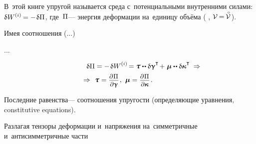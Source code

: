 \begin{otherlanguage}{russian}

В~этой книге упругой называется среда с~потенциальными внутренними силами:
${\variation{\internalwork} = - \hspace{.16ex} \variation{\potentialenergydensity}}$,
где~$\Pi$\:--- энергия деформации на~единицу объёма
( , ${\mathcal{V} \hspace{-0.2ex} = \hspace{-0.2ex} \mathcircabove{\mathcal{V}}\hspace{.12ex}}$).

Имея соотношения (...)

...

\begin{multline}\label{micropolar.constitutiveequations}
\hspace*{4em}
\variation{\potentialenergydensity} = - \hspace{.25ex} \variation{\internalwork} \hspace{-0.15ex}
= \forcestresstensor \dotdotp \variation{\distortiontensor}^{\T} \hspace{-0.25ex}
+ \hspace{.1ex} \couplestresstensor \dotdotp \variation{\wrynesstensor}^{\T}
\hspace{.6ex} \Rightarrow
\\[-0.1em]
%
\Rightarrow \hspace{.88ex}
\forcestresstensor = \scalebox{0.92}[0.92]{$ \displaystyle \frac{\raisemath{-0.125em}{\partial\hspace{.1ex} \potentialenergydensity^{\mathstrut}}}{\partial \distortiontensor}$}
\hspace{.15ex} ,
\hspace{.8ex}
\couplestresstensor = \scalebox{0.92}[0.92]{$ \displaystyle \frac{\raisemath{-0.125em}{\partial\hspace{.1ex} \potentialenergydensity^{\mathstrut}}}{\partial \wrynesstensor}$}
\hspace{.2ex} .
\hspace*{3.33em}
\end{multline}

Последние равенства\:--- соотношения упругости (определяющие уравнения, constitutive equations).

Разлагая тензоры деформации и~напряжения на~симметричные и~антисимметричные части


\end{otherlanguage}
